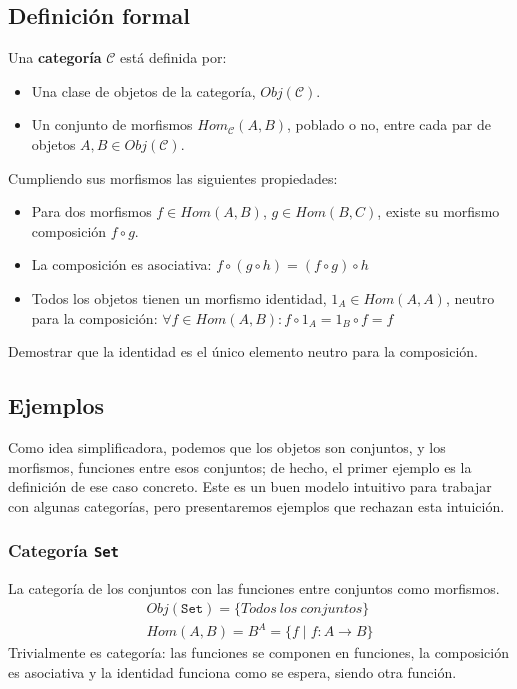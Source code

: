 \documentclass[a4paper, 11pt]{amsart}
\newcommand{\C}{\mathcal{C} }
\theoremstyle{definition}
\theoremstyle{remark}
\numberwithin{equation}{section}
\begin{document}
  \subsection {Definición formal}
    Una \textbf{categoría} $\C$ está definida por:
    \begin{itemize}
      \item Una clase de objetos de la categoría, $Obj(\mathcal{C})$.
      \item Un conjunto de morfismos $Hom_{\C}(A,B)$, poblado o no, entre cada par de objetos $A,B \in Obj(\C)$.
    \end{itemize}

    Cumpliendo sus morfismos las siguientes propiedades:
    \begin{itemize}
      \item Para dos morfismos $f \in Hom(A,B)$, $g \in Hom(B,C)$, existe su morfismo composición $f \circ g$.
      \item La composición es asociativa: $ f \circ (g \circ h) = (f \circ g) \circ h$
      \item Todos los objetos tienen un morfismo identidad, $1_{A} \in Hom(A,A)$, 
	  neutro para la composición: $\forall f \in Hom(A,B): f \circ 1_{A} = 1_{B} \circ f = f$
    \end{itemize}
    
    \exca Demostrar que la identidad es el único elemento neutro para la composición.

  \subsection {Ejemplos}
    Como idea simplificadora, podemos que los objetos son conjuntos, y los morfismos, funciones
    entre esos conjuntos; de hecho, el primer ejemplo es la definición de ese caso concreto. 
    Este es un buen modelo intuitivo para trabajar con algunas categorías,
    pero presentaremos ejemplos que rechazan esta intuición.
    \subsubsection{Categoría \texttt{Set}}
      La categoría de los conjuntos con las funciones entre conjuntos como morfismos.
      \begin{gather*}
        Obj(\texttt{Set}) = \{Todos\ los\ conjuntos\} \\
        Hom(A,B)= B^A = \{f \;|\; f: A \rightarrow B \}
      \end{gather*}
      Trivialmente es categoría: las funciones se componen en funciones, la composición es
      asociativa y la identidad funciona como se espera, siendo otra función.
      
\end{document}

